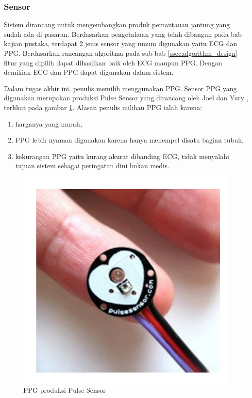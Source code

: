 \subsubsection{Sensor}
Sistem dirancang untuk mengembangkan produk pemantauan jantung yang sudah ada di pasaran. Berdasarkan pengetahuan yang telah dibangun pada bab kajian pustaka, terdapat 2 jenis sensor yang umum digunakan yaitu ECG dan PPG. Berdasarkan rancangan algoritma pada sub bab \ref{ssec:algorithm_design} fitur yang dipilih dapat dihasilkan baik oleh ECG maupun PPG. Dengan demikian ECG dan PPG dapat digunakan dalam sistem.

Dalam tugas akhir ini, penulis memilih menggunakan PPG. Sensor PPG yang digunakan merupakan produksi Pulse Sensor yang dirancang oleh Joel dan Yury \cite{pulse_sensor}, terlihat pada gambar \ref{pulse_sensor}. Alasan penulis milihan PPG ialah karena:
\begin{enumerate}
	\item harganya yang murah,
	\item PPG lebih nyaman digunakan karena hanya menempel disatu bagian tubuh,
	\item kekurangan PPG yaitu kurang akurat dibanding ECG, tidak menyalahi tujuan sistem sebagai peringatan dini bukan medis.
\end{enumerate}

\begin{figure}[H]
	\centering
	\includegraphics[scale=0.1]{images/pulse_sensor.jpg}
	\caption{PPG produksi Pulse Sensor}
	\label{pulse_sensor}
\end{figure}

